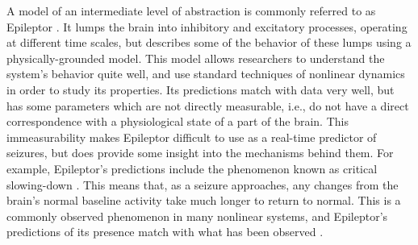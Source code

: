 A model of an intermediate level of abstraction is commonly referred to as Epileptor \autocite{Jirsa2014}.
It lumps the brain into inhibitory and excitatory processes, operating at different time scales, but describes some of the behavior of these lumps using a physically-grounded model.
This model allows researchers to understand the system's behavior quite well, and use standard techniques of nonlinear dynamics in order to study its properties.
Its predictions match with data very well, but has some parameters which are not directly measurable, i.e., do not have a direct correspondence with a physiological state of a part of the brain.
This immeasurability makes Epileptor difficult to use as a real-time predictor of seizures, but does provide some insight into the mechanisms behind them.
For example, Epileptor's predictions include the phenomenon known as critical slowing-down \autocite{Jirsa2014}.
This means that, as a seizure approaches, any changes from the brain's normal baseline activity take much longer to return to normal.
This is a commonly observed phenomenon in many nonlinear systems, and Epileptor's predictions of its presence match with what has been observed \autocite{Scheffer2009}.

